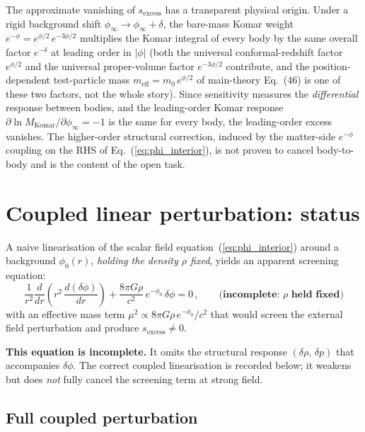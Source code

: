 \documentclass[11pt]{article}
\begin{document}
The approximate vanishing of $s_{\mathrm{excess}}$ has a
transparent physical origin.  Under a rigid background
shift $\phi_\infty\to\phi_\infty+\delta$, the bare-mass
Komar weight $e^{-\phi}=e^{\phi/2}\,e^{-3\phi/2}$
multiplies the Komar integral of every body by the same
overall factor $e^{-\delta}$ at leading order in $|\phi|$
(both the universal conformal-redshift factor $e^{\phi/2}$
and the universal proper-volume factor $e^{-3\phi/2}$
contribute, and the position-dependent test-particle mass
$m_{\mathrm{eff}}=m_0\,e^{\phi/2}$ of main-theory Eq.~(46)
is one of these two factors, not the whole story).  Since
sensitivity measures the \emph{differential} response
between bodies, and the leading-order Komar response
$\partial\ln M_{\mathrm{Komar}}/\partial\phi_\infty=-1$
is the same for every body, the leading-order excess
vanishes.  The higher-order structural correction,
induced by the matter-side $e^{-\phi}$ coupling on the
RHS of Eq.~(\ref{eq:phi_interior}), is not proven to
cancel body-to-body and is the content of the open task.

\section{Coupled linear perturbation: status}
\label{sec:correction}

A naive linearisation of the scalar field
equation~(\ref{eq:phi_interior}) around a background
$\phi_0(r)$, \emph{holding the density $\rho$ fixed},
yields an apparent screening equation:
\begin{equation}\label{eq:wrong_pert}
  \frac{1}{r^2}\frac{d}{dr}\!\left(r^2\,
  \frac{d(\delta\phi)}{dr}\right)
  + \frac{8\pi G\rho}{c^2}\,e^{-\phi_0}\,\delta\phi
  = 0\,,
  \qquad\textbf{(incomplete: $\rho$ held fixed)}
\end{equation}
with an effective mass term $\mu^2 \propto 8\pi G\rho\,
e^{-\phi_0}/c^2$ that would screen the external field
perturbation and produce $s_{\mathrm{excess}} \neq 0$.

\textbf{This equation is incomplete.}  It omits the
structural response $(\delta\rho,\,\delta p)$ that
accompanies $\delta\phi$.  The correct coupled
linearisation is recorded below; it weakens but does
\emph{not} fully cancel the screening term at strong
field.

\subsection{Full coupled perturbation}
\end{document}
